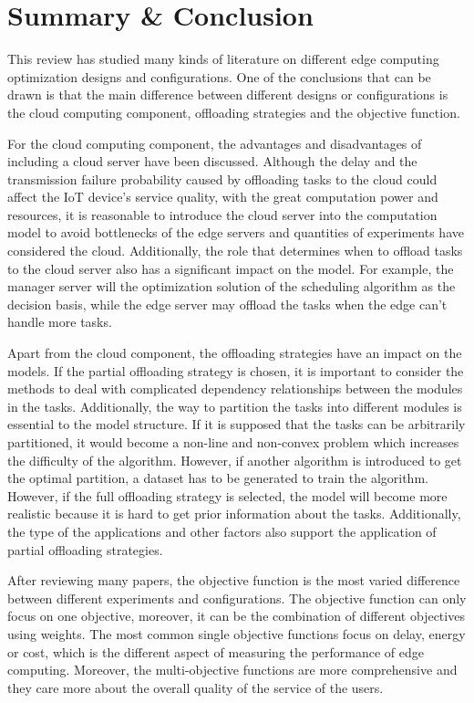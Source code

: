 \documentclass[a4paper,11pt]{article}
\begin{document}
\section{Summary \& Conclusion}
This review has studied many kinds of literature on different edge computing optimization designs and configurations. One of the conclusions that can be drawn is that the main difference between different designs or configurations is the cloud computing component, offloading strategies and the objective function. \newline

For the cloud computing component, the advantages and disadvantages of including a cloud server have been discussed. Although the delay and the transmission failure probability caused by offloading tasks to the cloud could affect the IoT device's service quality, with the great computation power and resources, it is reasonable to introduce the cloud server into the computation model to avoid bottlenecks of the edge servers and quantities of experiments have considered the cloud. Additionally, the role that determines when to offload tasks to the cloud server also has a significant impact on the model. For example, the manager server will the optimization solution of the scheduling algorithm as the decision basis, while the edge server may offload the tasks when the edge can't handle more tasks. \newline

Apart from the cloud component, the offloading strategies have an impact on the models. If the partial offloading strategy is chosen, it is important to consider the methods to deal with complicated dependency relationships between the modules in the tasks. Additionally, the way to partition the tasks into different modules is essential to the model structure. If it is supposed that the tasks can be arbitrarily partitioned, it would become a non-line and non-convex problem which increases the difficulty of the algorithm. However, if another algorithm is introduced to get the optimal partition, a dataset has to be generated to train the algorithm. However, if the full offloading strategy is selected, the model will become more realistic because it is hard to get prior information about the tasks. Additionally, the type of the applications and other factors also support the application of partial offloading strategies. \newline

After reviewing many papers, the objective function is the most varied difference between different experiments and configurations. The objective function can only focus on one objective, moreover, it can be the combination of different objectives using weights. The most common single objective functions focus on delay, energy or cost, which is the different aspect of measuring the performance of edge computing. Moreover, the multi-objective functions are more comprehensive and they care more about the overall quality of the service of the users.\newline
\end{document}
